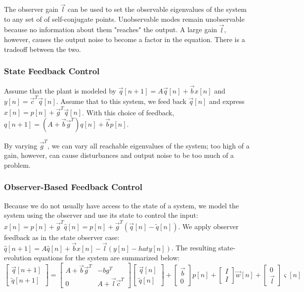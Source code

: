 \documentclass[8pt]{extarticle}
\begin{document}
\begin{multicols*}{3}
\begin{center}
The observer gain \( \vec{l} \) can be used to set the observable eigenvalues of the system to any set of of self-conjugate points. Unobservable modes remain unobservable because no information about them "reaches" the output. A large gain \( \vec{l} \), however, causes the output noise to become a factor in the equation. There is a tradeoff between the two.

\subsubsection{State Feedback Control}
Assume that the plant is modeled by \( \vec{q}[n+1] = A\vec{q}[n] + \vec{b}x[n] \) and \( y[n] = \vec{c}^T \vec{q}[n] \). Assume that to this system, we feed back \( \vec{q}[n] \) and express \( x[n] = p[n] + \vec{g}^T\vec{q}[n] \). With this choice of feedback, \( q[n+1] = (A + \vec{b}\vec{g}^T)q[n] + \vec{b}p[n] \).

By varying \( \vec{g}^T \), we can vary all reachable eigenvalues of the system; too high of a gain, however, can cause disturbances and output noise to be too much of a problem.

\subsubsection{Observer-Based Feedback Control}
Because we do not usually have access to the state of a system, we model the system using the observer and use its state to control the input: \( x[n] = p[n] + \vec{g}^T \hat{q}[n] = p[n] + \vec{g}^T(\vec{q}[n] - \tilde{q}[n]) \). We apply observer feedback as in the state observer case: \( \hat{q}[n+1] = A\hat{q}[n] + \vec{b}x[n] - \vec{l}(y[n]-hat{y}[n])\). The resulting state-evolution equations for the system are summarized below: \\

\( \begin{bmatrix} \vec{q}[n+1] \\ \tilde{q}[n+1] \end{bmatrix} =
\begin{bmatrix} A+\vec{b}\vec{g}^T & -bg^T \\ 0 & A + \vec{l}\vec{c}^T \end{bmatrix}
\begin{bmatrix} \vec{q}[n] \\ \tilde{q}[n] \end{bmatrix} + 
\begin{bmatrix} \vec{b} \\ 0 \end{bmatrix}p[n] + 
\begin{bmatrix} I \\ I \end{bmatrix} \vec{w}[n] + 
\begin{bmatrix} 0 \\ \vec{l} \end{bmatrix} \varsigma[n]
\)


\end{center}
\end{multicols*}
\end{document}
